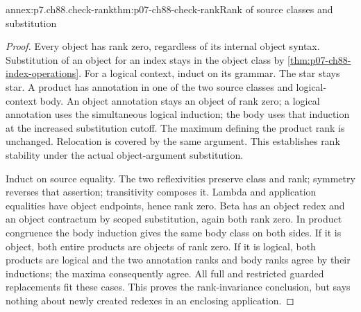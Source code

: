 \begin{annexitem}{annex:p7.ch88.check-rank}{thm:p07-ch88-check-rank}{Rank of source classes and substitution}
\begin{proof}
Every object has rank zero, regardless of its internal object syntax.
Substitution of an object for an index stays in the object class by
\cref{thm:p07-ch88-index-operations}. For a logical context, induct on
its grammar. The star stays star. A product has annotation in one of
the two source classes and logical-context body. An object annotation
stays an object of rank zero; a logical annotation uses the simultaneous
logical induction; the body uses that induction at the increased
substitution cutoff. The maximum defining the product rank is unchanged.
Relocation is covered by the same argument. This establishes rank
stability under the actual object-argument substitution.

Induct on source equality. The two reflexivities preserve class and
rank; symmetry reverses that assertion; transitivity composes it.
Lambda and application equalities have object endpoints, hence rank
zero. Beta has an object redex and an object contractum by scoped
substitution, again both rank zero. In product congruence the body
induction gives the same body class on both sides. If it is object,
both entire products are objects of rank zero. If it is logical,
both products are logical and the two annotation ranks and body ranks
agree by their inductions; the maxima consequently agree. All full
and restricted guarded replacements fit these cases. This proves the
rank-invariance conclusion, but says nothing about newly
created redexes in an enclosing application.
\end{proof}
\end{annexitem}

